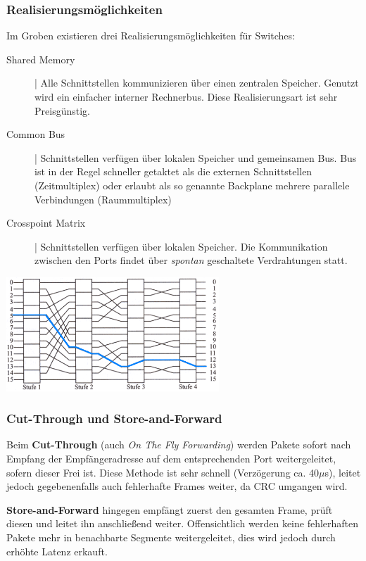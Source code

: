 \documentclass{article} %
\begin{document}
\subsubsection{Realisierungsmöglichkeiten}
Im Groben existieren drei Realisierungsmöglichkeiten für Switches:
\begin{description}
	\item[Shared Memory] | Alle Schnittstellen kommunizieren über einen zentralen Speicher.
	Genutzt wird ein einfacher interner Rechnerbus.
	Diese Realisierungsart ist sehr Preisgünstig.
	\item[Common Bus] | Schnittstellen verfügen über lokalen Speicher und gemeinsamen Bus.
	Bus ist in der Regel schneller getaktet als die externen Schnittstellen 	(Zeitmultiplex) oder erlaubt als so genannte Backplane mehrere 	parallele Verbindungen (Raummultiplex)
	\item[Crosspoint Matrix] | Schnittstellen verfügen über lokalen Speicher.
	Die Kommunikation zwischen den Ports findet über \emph{spontan} geschaltete Verdrahtungen statt.
\end{description}
\begin{center}
	\includegraphics[width=8cm]{img/crosspoint_matrix}
\end{center}


\subsubsection{Cut-Through und Store-and-Forward}
Beim \textbf{Cut-Through} (auch \emph{On The Fly Forwarding}) werden Pakete sofort nach Empfang der Empfängeradresse auf dem entsprechenden Port weitergeleitet, sofern dieser Frei ist.
Diese Methode ist sehr schnell (Verzögerung ca. 40$\mu$s), leitet jedoch gegebenenfalls auch fehlerhafte Frames weiter, da CRC umgangen wird.

\textbf{Store-and-Forward} hingegen empfängt zuerst den gesamten Frame, prüft diesen und leitet ihn anschließend weiter.
Offensichtlich werden keine fehlerhaften Pakete mehr in benachbarte Segmente weitergeleitet, dies wird jedoch durch erhöhte Latenz erkauft.
\end{document}
